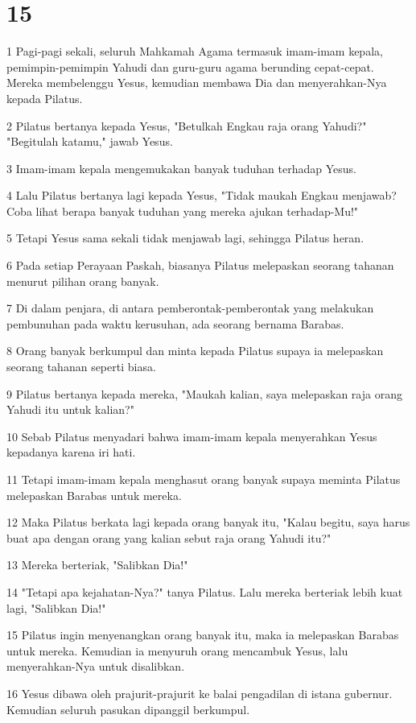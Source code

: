 \chapter{15}

\par 1 Pagi-pagi sekali, seluruh Mahkamah Agama termasuk imam-imam kepala, pemimpin-pemimpin Yahudi dan guru-guru agama berunding cepat-cepat. Mereka membelenggu Yesus, kemudian membawa Dia dan menyerahkan-Nya kepada Pilatus.
\par 2 Pilatus bertanya kepada Yesus, "Betulkah Engkau raja orang Yahudi?" "Begitulah katamu," jawab Yesus.
\par 3 Imam-imam kepala mengemukakan banyak tuduhan terhadap Yesus.
\par 4 Lalu Pilatus bertanya lagi kepada Yesus, "Tidak maukah Engkau menjawab? Coba lihat berapa banyak tuduhan yang mereka ajukan terhadap-Mu!"
\par 5 Tetapi Yesus sama sekali tidak menjawab lagi, sehingga Pilatus heran.
\par 6 Pada setiap Perayaan Paskah, biasanya Pilatus melepaskan seorang tahanan menurut pilihan orang banyak.
\par 7 Di dalam penjara, di antara pemberontak-pemberontak yang melakukan pembunuhan pada waktu kerusuhan, ada seorang bernama Barabas.
\par 8 Orang banyak berkumpul dan minta kepada Pilatus supaya ia melepaskan seorang tahanan seperti biasa.
\par 9 Pilatus bertanya kepada mereka, "Maukah kalian, saya melepaskan raja orang Yahudi itu untuk kalian?"
\par 10 Sebab Pilatus menyadari bahwa imam-imam kepala menyerahkan Yesus kepadanya karena iri hati.
\par 11 Tetapi imam-imam kepala menghasut orang banyak supaya meminta Pilatus melepaskan Barabas untuk mereka.
\par 12 Maka Pilatus berkata lagi kepada orang banyak itu, "Kalau begitu, saya harus buat apa dengan orang yang kalian sebut raja orang Yahudi itu?"
\par 13 Mereka berteriak, "Salibkan Dia!"
\par 14 "Tetapi apa kejahatan-Nya?" tanya Pilatus. Lalu mereka berteriak lebih kuat lagi, "Salibkan Dia!"
\par 15 Pilatus ingin menyenangkan orang banyak itu, maka ia melepaskan Barabas untuk mereka. Kemudian ia menyuruh orang mencambuk Yesus, lalu menyerahkan-Nya untuk disalibkan.
\par 16 Yesus dibawa oleh prajurit-prajurit ke balai pengadilan di istana gubernur. Kemudian seluruh pasukan dipanggil berkumpul.
